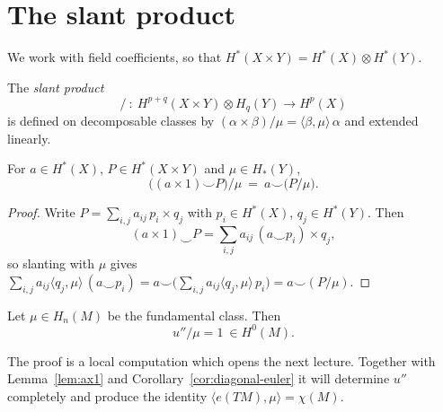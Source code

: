 \section{The slant product}

We work with field coefficients, so that $H^*(X\times Y)=H^*(X)\otimes H^*(Y)$.

\begin{definition}
The \emph{slant product}
\[
/\ \colon\ H^{p+q}(X\times Y)\otimes H_q(Y)\longrightarrow H^p(X)
\]
is defined on decomposable classes by
$(\alpha\times\beta)/\mu=\langle\beta,\mu\rangle\,\alpha$ and extended linearly.
\end{definition}

\begin{lemma}\label{lem:slant-identity}
For $a\in H^*(X)$, $P\in H^*(X\times Y)$ and $\mu\in H_*(Y)$,
\[
\big((a\times1)\smile P\big)\big/\mu\ =\ a\smile\big(P/\mu\big).
\]
\end{lemma}

\begin{proof}
Write $P=\sum_{i,j}a_{ij}\,p_i\times q_j$ with $p_i\in H^*(X)$,
$q_j\in H^*(Y)$. Then
\[
(a\times1)\smile P=\sum_{i,j}a_{ij}\,(a\smile p_i)\times q_j ,
\]
so slanting with $\mu$ gives
$\sum_{i,j}a_{ij}\langle q_j,\mu\rangle\,(a\smile p_i)
=a\smile\big(\sum_{i,j}a_{ij}\langle q_j,\mu\rangle\,p_i\big)=a\smile(P/\mu)$.
\end{proof}

\begin{lemma}\label{lem:u-over-mu}
Let $\mu\in H_n(M)$ be the fundamental class. Then
\[
u''/\mu=1\ \in H^0(M).
\]
\end{lemma}

The proof is a local computation which opens the next lecture. Together with
Lemma~\ref{lem:ax1} and Corollary~\ref{cor:diagonal-euler} it will determine
$u''$ completely and produce the identity
$\langle e(TM),\mu\rangle=\chi(M)$.
